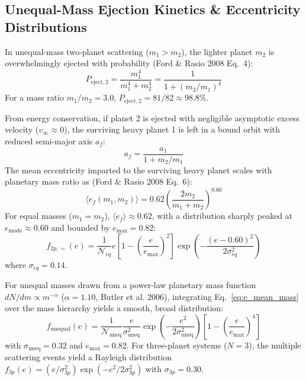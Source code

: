 \documentclass[11pt,a4paper]{article}
\begin{document}
\subsection{Unequal-Mass Ejection Kinetics \& Eccentricity Distributions}
In unequal-mass two-planet scattering ($m_1 > m_2$), the lighter planet $m_2$ is overwhelmingly ejected with probability (Ford \& Rasio 2008 Eq.~4):
\begin{equation}
P_{\text{eject},2} = \frac{m_1^4}{m_1^4 + m_2^4} = \frac{1}{1 + (m_2/m_1)^4}
\label{eq:p_eject_light}
\end{equation}
For a mass ratio $m_1/m_2 = 3.0$, $P_{\text{eject},2} = 81/82 \approx 98.8\%$.

From energy conservation, if planet 2 is ejected with negligible asymptotic excess velocity ($v_\infty \approx 0$), the surviving heavy planet 1 is left in a bound orbit with reduced semi-major axis $a_f$:
\begin{equation}
a_f = \frac{a_1}{1 + m_2 / m_1}
\label{eq:a_final}
\end{equation}
The mean eccentricity imparted to the surviving heavy planet scales with planetary mass ratio as (Ford \& Rasio 2008 Eq.~6):
\begin{equation}
\langle e_f(m_1, m_2) \rangle = 0.62 \left( \frac{2 m_2}{m_1 + m_2} \right)^{0.60}
\label{eq:e_mean_mass}
\end{equation}
For equal masses ($m_1 = m_2$), $\langle e_f \rangle \approx 0.62$, with a distribution sharply peaked at $e_{\text{mode}} \approx 0.60$ and bounded by $e_{\text{max}} = 0.82$:
\begin{equation}
f_{2p,=}(e) = \frac{1}{\mathcal{N}_{eq}} e \left[ 1 - \left(\frac{e}{e_{\text{max}}}\right)^2 \right] \exp\left( -\frac{(e - 0.60)^2}{2 \sigma_{eq}^2} \right)
\label{eq:pdf_equal}
\end{equation}
where $\sigma_{eq} = 0.14$.

For unequal masses drawn from a power-law planetary mass function $dN/dm \propto m^{-\alpha}$ ($\alpha = 1.10$, Butler et al. 2006), integrating Eq.~\eqref{eq:e_mean_mass} over the mass hierarchy yields a smooth, broad distribution:
\begin{equation}
f_{\text{unequal}}(e) = \frac{1}{\mathcal{N}_{\text{uneq}}} \frac{e}{\sigma_{\text{uneq}}^2} \exp\left( -\frac{e^2}{2 \sigma_{\text{uneq}}^2} \right) \left[ 1 - \left(\frac{e}{e_{\text{max}}}\right)^4 \right]
\label{eq:pdf_unequal}
\end{equation}
with $\sigma_{\text{uneq}} = 0.32$ and $e_{\text{max}} = 0.82$. For three-planet systems ($N=3$), the multiple scattering events yield a Rayleigh distribution $f_{3p}(e) = (e/\sigma_{3p}^2) \exp(-e^2/2\sigma_{3p}^2)$ with $\sigma_{3p} = 0.30$.
\end{document}
